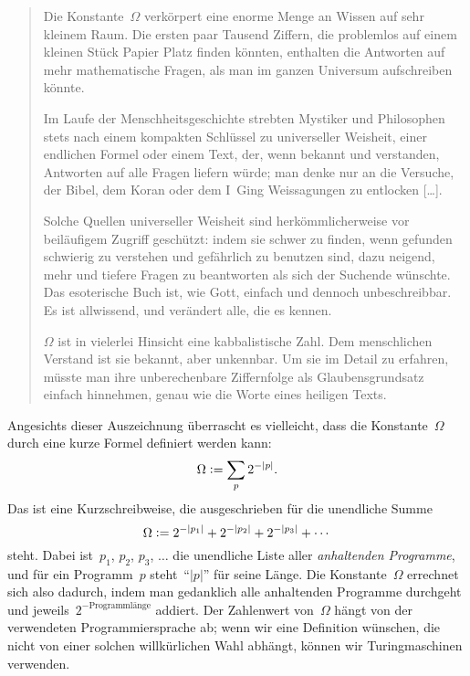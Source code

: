 \documentclass[twoside]{../zirkelblatt1415}
\theoremstyle{definition}
\theoremstyle{plain}
\theoremstyle{remark}
\newcommand{\defeq}{\vcentcolon=}
\begin{document}
\begin{quote}
Die Konstante~$\Omega$ verkörpert eine enorme Menge an Wissen auf sehr kleinem Raum.
Die ersten paar Tausend Ziffern, die problemlos auf einem kleinen Stück Papier
Platz finden könnten, enthalten die Antworten auf mehr mathematische Fragen,
als man im ganzen Universum aufschreiben könnte.

Im Laufe der Menschheitsgeschichte strebten Mystiker und Philosophen stets nach einem
kompakten Schlüssel zu universeller Weisheit, einer endlichen Formel
oder einem Text, der, wenn bekannt und verstanden, Antworten auf alle Fragen
liefern würde; man denke nur an die Versuche, der Bibel, dem Koran oder dem I~Ging
Weissagungen zu entlocken [\ldots].

Solche Quellen universeller Weisheit sind herkömmlicherweise vor beiläufigem
Zugriff geschützt: indem sie schwer zu finden, wenn gefunden schwierig zu
verstehen und gefährlich zu benutzen sind, dazu neigend, mehr und
tiefere Fragen zu beantworten als sich der Suchende wünschte. Das esoterische
Buch ist, wie Gott, einfach und dennoch unbeschreibbar. Es ist allwissend, und
verändert alle, die es kennen.

$\Omega$ ist in vielerlei Hinsicht eine kabbalistische Zahl. Dem menschlichen
Verstand ist sie bekannt, aber unkennbar. Um sie im Detail zu erfahren, müsste
man ihre unberechenbare Ziffernfolge als Glaubensgrundsatz einfach hinnehmen,
genau wie die Worte eines heiligen Texts.
\end{quote}

Angesichts dieser Auszeichnung überrascht es vielleicht, dass die Konstante~$\Omega$
durch eine kurze Formel definiert werden kann:
\[ \Omega \defeq \sum_p 2^{-|p|}. \]
Das ist eine Kurzschreibweise, die ausgeschrieben für die unendliche Summe
\[ \Omega \defeq 2^{-|p_1|} + 2^{-|p_2|} + 2^{-|p_3|} + \cdots \]
steht. Dabei ist~$p_1$, $p_2$, $p_3$, $\ldots$ die unendliche Liste aller
\emph{anhaltenden Programme}, und für ein Programm~$p$ steht~"`$|p|$"' für
seine Länge. Die Konstante~$\Omega$ errechnet sich also dadurch, indem man
gedanklich alle anhaltenden Programme durchgeht und
jeweils~$2^{-\text{Programmlänge}}$ addiert. Der Zahlenwert von~$\Omega$ hängt
von der verwendeten Programmiersprache ab; wenn wir eine Definition wünschen,
die nicht von einer solchen willkürlichen Wahl abhängt, können wir
Turingmaschinen verwenden.
\end{document}
